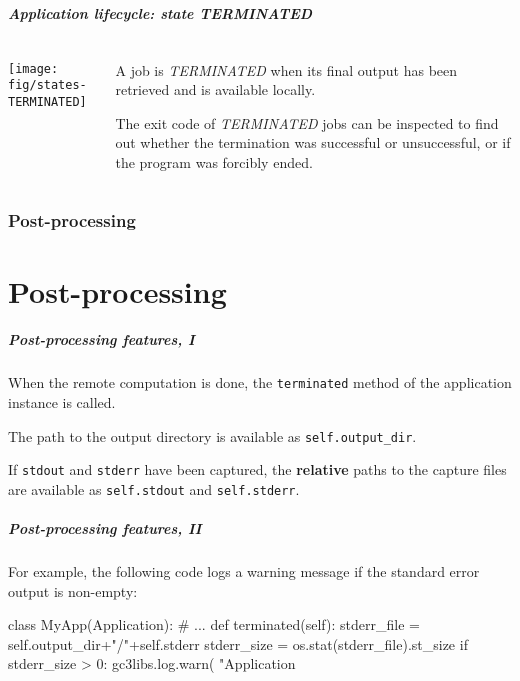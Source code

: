 \documentclass[english,serif,mathserif,xcolor=pdftex,dvipsnames,table]{beamer}
\begin{document}
\begin{frame}[fragile]
\frametitle{Application lifecycle: state TERMINATED}

\begin{columns}[c]
  \begin{column}{0.5\textwidth}
    \texttt{[image: fig/states-TERMINATED]}
  \end{column}
  \begin{column}{0.5\textwidth}
    \raggedleft
    A job is \emph{TERMINATED} when its final output has been
    retrieved and is available locally.

    \+
    The exit code of \emph{TERMINATED} jobs can be inspected to
    find out whether the termination was successful or unsuccessful,
    or if the program was forcibly ended.
  \end{column}
\end{columns}
\end{frame}


\section{Post-processing}
\part{Post-processing}

\begin{frame}[fragile]
  \frametitle{Post-processing features, I}

  When the remote computation is done, the \texttt{terminated} method
  of the application instance is called.

  \+
  The path to the output directory is available as
  \lstinline|self.output_dir|.

  \+
  If \texttt{stdout} and \texttt{stderr}
  have been captured, the \textbf{relative} paths to the capture files
  are available as \lstinline|self.stdout| and
  \lstinline|self.stderr|.
\end{frame}


\begin{frame}[fragile]
  \frametitle{Post-processing features, II}

  For example, the following code logs a warning message if the
  standard error output is non-empty:
\begin{python}
class MyApp(Application):
  # ...
  def terminated(self):
    stderr_file = self.output_dir+"/"+self.stderr
    stderr_size = os.stat(stderr_file).st_size
    if stderr_size > 0:
      gc3libs.log.warn(
        "Application %
\end{python}
\end{frame}
\end{document}

